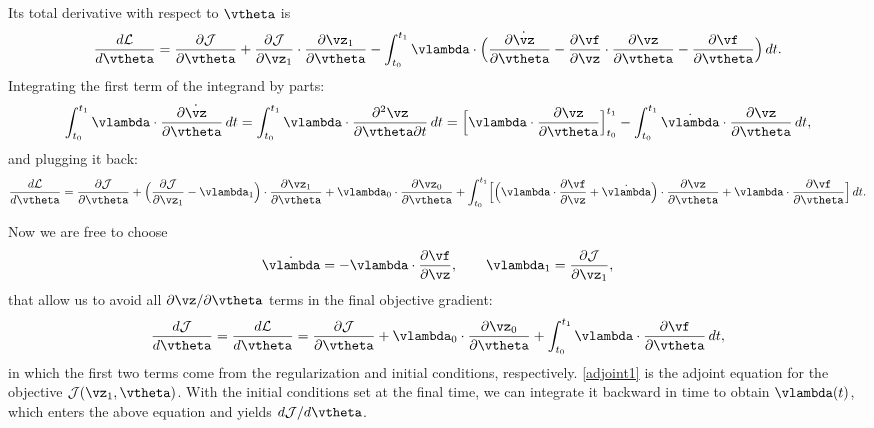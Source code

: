 \documentclass[modern, trackchanges, dvipsnames]{aastex631}
\renewcommand{\d}{d}
\newcommand{\p}{\partial}
\newcommand{\cJ}{\mathcal{J}}
\newcommand{\cL}{\mathcal{L}}
\begin{document}
Its total derivative with respect to $\vtheta$ is
%
\begin{equation}
\frac{\d\cL}{\d\vtheta}
= \frac{\p\cJ}{\p\vtheta}
+ \frac{\p\cJ}{\p\vz_1} \cdot \frac{\p\vz_1}{\p\vtheta}
- \int_{t_0}^{t_1} \vlambda
  \cdot \Bigl( \frac{\p\dot\vz}{\p\vtheta}
    - \frac{\p\vf}{\p\vz} \cdot \frac{\p\vz}{\p\vtheta}
    - \frac{\p\vf}{\p\vtheta} \Bigr) \, \d t.
\end{equation}
%
Integrating the first term of the integrand by parts:
%
\begin{equation}
\int_{t_0}^{t_1} \vlambda \cdot \frac{\p\dot\vz}{\p\vtheta} \, \d t
= \int_{t_0}^{t_1} \vlambda \cdot \frac{\p^2\vz}{\p\vtheta\p t} \, \d t
= \Bigl[ \vlambda \cdot \frac{\p\vz}{\p\vtheta} \Bigr]_{t_0}^{t_1}
- \int_{t_0}^{t_1} \dot \vlambda \cdot \frac{\p\vz}{\p\vtheta} \, \d t,
\end{equation}
%
and plugging it back:
%
\begin{equation}
\frac{\d\cL}{\d\vtheta}
= \frac{\p\cJ}{\p\vtheta}
+ \Bigl( \frac{\p\cJ}{\p\vz_1} - \vlambda_1 \Bigr)
  \cdot \frac{\p\vz_1}{\p\vtheta}
+ \vlambda_0 \cdot \frac{\p\vz_0}{\p\vtheta}
+ \int_{t_0}^{t_1} \Bigl[
  \Bigl( \vlambda \cdot \frac{\p\vf}{\p\vz} + \dot\vlambda \Bigr)
  \cdot \frac{\p\vz}{\p\vtheta}
  + \vlambda \cdot \frac{\p\vf}{\p\vtheta} \Bigr] \, \d t.
\end{equation}

Now we are free to choose
%
\begin{equation}
\dot\vlambda = - \vlambda \cdot \frac{\p\vf}{\p\vz},
\qquad
\vlambda_1 = \frac{\p\cJ}{\p\vz_1},
\label{adjoint1}
\end{equation}
%
that allow us to avoid all $\p\vz/\p\vtheta$ terms in the final
objective gradient:
%
\begin{equation}
\frac{\d\cJ}{\d\vtheta}
= \frac{\d\cL}{\d\vtheta}
= \frac{\p\cJ}{\p\vtheta} + \vlambda_0 \cdot \frac{\p\vz_0}{\p\vtheta}
+ \int_{t_0}^{t_1} \vlambda \cdot \frac{\p\vf}{\p\vtheta} \, \d t,
\end{equation}
%
in which the first two terms come from the regularization and initial
conditions, respectively.
\eqref{adjoint1} is the adjoint equation for the objective $\cJ(\vz_1,
\vtheta)$.
With the initial conditions set at the final time, we can integrate it
backward in time to obtain $\vlambda(t)$, which enters the above
equation and yields $\d\cJ / \d\vtheta$.
\end{document}

